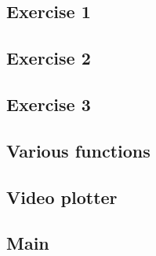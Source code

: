 \documentclass{article}
\begin{document}
\subsection{Exercise 1}


\subsection{Exercise 2}


\subsection{Exercise 3}


\subsection{Various functions}


\subsection{Video plotter}


\subsection{Main}

\end{document}
